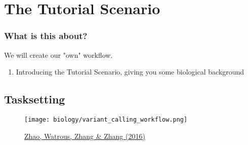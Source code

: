 \section{The Tutorial Scenario}
{   
}

\begin{frame}
	\frametitle{What is this about?}
	\begin{docs}[Objective]
		We will create our "own" workflow. 
		\begin{enumerate}
			\item Introducing the Tutorial Scenario, giving you some biological background 
		\end{enumerate}
	\end{docs}
\end{frame}

\subsection{Tasksetting}

\begin{frame}
  \begin{figure}
    \centering
    \texttt{[image: biology/variant\_calling\_workflow.png]}

    \smallskip

    \caption{\href{https://www.intechopen.com/chapters/53334}{Zhao, Watrous, Zhang \& Zhang (2016)}}
  \end{figure}
\end{frame}





